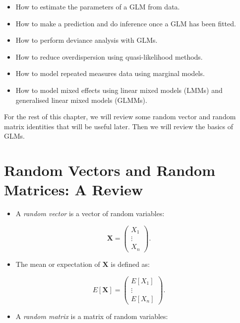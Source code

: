 \documentclass[
  12pt,
]{book}
\providecommand{\tightlist}{%
  \setlength{\itemsep}{0pt}\setlength{\parskip}{0pt}}
\begin{document}
\begin{itemize}
\item
  How to estimate the parameters of a GLM from data.
\item
  How to make a prediction and do inference once a GLM has been fitted.
\item
  How to perform deviance analysis with GLMs.
\item
  How to reduce overdispersion using quasi-likelihood methods.
\item
  How to model repeated measures data using marginal models.
\item
  How to model mixed effects using linear mixed models (LMMs) and generalised linear mixed models (GLMMs).
\end{itemize}

For the rest of this chapter, we will review some random vector and random matrix identities that will be useful later. Then we will review the basics of GLMs.

\section{Random Vectors and Random Matrices: A Review}\label{ranmat}

\begin{itemize}
\tightlist
\item
  A \emph{random vector} is a vector of random variables:
\end{itemize}

\[\boldsymbol{X} = \left(\begin{array}{c} X_1 \\ \vdots \\ X_n \end{array}\right).\]

\begin{itemize}
\tightlist
\item
  The mean or expectation of \(\boldsymbol{X}\) is defined as:
\end{itemize}

\[E[\boldsymbol{X}] = \left(\begin{array}{c} E[X_1] \\ \vdots \\ E[X_n] \end{array}\right).\]

\begin{itemize}
\tightlist
\item
  A \emph{random matrix} is a matrix of random variables:
\end{itemize}
\end{document}
